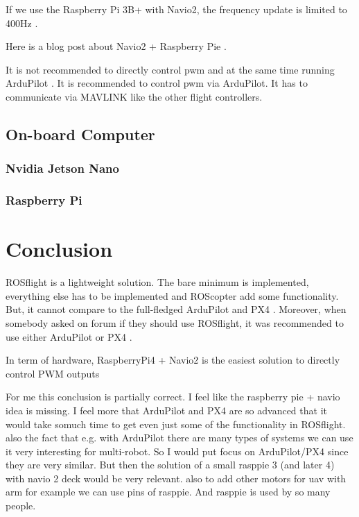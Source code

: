 If we use the Raspberry Pi 3B+ with Navio2, the frequency update is limited to 400Hz \cite{emlid_pwm_frequency}.

Here is a blog post about Navio2 + Raspberry Pie \cite{dojofordrones_rpi_drone}.

It is not recommended to directly control pwm and at the same time running ArduPilot \cite{emlid_servo_control}. It is recommended to control pwm via ArduPilot. It has to communicate via MAVLINK like the other flight controllers.

\subsection{On-board Computer}
\subsubsection{Nvidia Jetson Nano}

\subsubsection{Raspberry Pi}

\section{Conclusion}
ROSflight is a lightweight solution. The bare minimum is implemented, everything else has to be implemented and ROScopter add some functionality. But, it cannot compare to the full-fledged ArduPilot and PX4 \cite{reddit_firmware_ros}. Moreover, when somebody asked on forum if they should use ROSflight, it was recommended to use either ArduPilot or PX4 \cite{reddit_swarm_ros}.

In term of hardware, RaspberryPi4 + Navio2 is the easiest solution to directly control PWM outputs

    {\color{red}For me this conclusion is partially correct. I feel like the raspberry pie + navio idea is missing. }
    {\color{red}I feel more that ArduPilot and PX4 are so advanced that it would take somuch time to get even just some of the functionality in ROSflight. also the fact that e.g. with ArduPilot there are many types of systems we can use it very interesting for multi-robot. So I would put focus on ArduPilot/PX4 since they are very similar. But then the solution of a small rasppie 3 (and later 4) with navio 2 deck would be very relevant. also to add other motors for uav with arm for example we can use pins of rasppie. And rasppie is used by so many people.}
